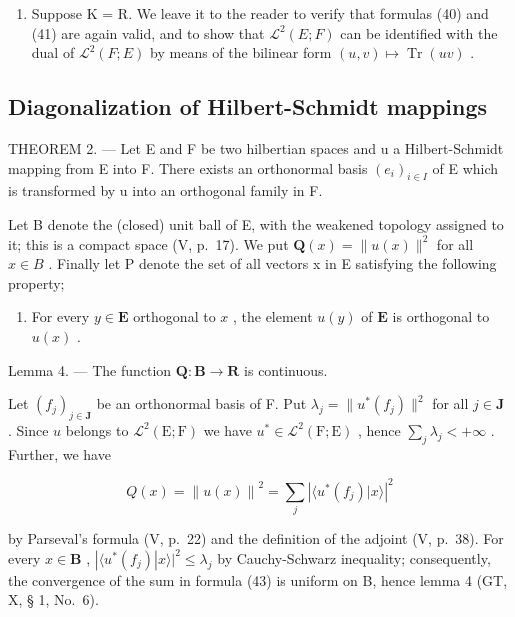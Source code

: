 \begin{enumerate}
\def\labelenumi{\arabic{enumi})}
\setcounter{enumi}{1}
\tightlist
\item
  Suppose K = R. We leave it to the reader to verify that formulas (40) and (41) are again valid, and to show that \(\mathcal{L}^{2}(E; F)\) can be identified with the dual of \(\mathcal{L}^{2}(F; E)\) by means of the bilinear form \((u, v) \mapsto \operatorname{Tr}(uv)\) .
\end{enumerate}

\subsection{Diagonalization of Hilbert-Schmidt mappings}

THEOREM 2. --- Let E and F be two hilbertian spaces and u a Hilbert-Schmidt mapping from E into F. There exists an orthonormal basis \((e_{i})_{i\in I}\) of E which is transformed by u into an orthogonal family in F.

Let B denote the (closed) unit ball of E, with the weakened topology assigned to it; this is a compact space (V, p.~17). We put \(\mathbf{Q}(x) = \|u(x)\|^{2}\) for all \(x \in B\) . Finally let P denote the set of all vectors x in E satisfying the following property;

\begin{enumerate}
\def\labelenumi{(\Alph{enumi})}
\setcounter{enumi}{7}
\tightlist
\item
  For every \(y \in \mathbf{E}\) orthogonal to \(x\) , the element \(u(y)\) of \(\mathbf{E}\) is orthogonal to \(u(x)\) .
\end{enumerate}

Lemma 4. --- The function \(\mathbf{Q}:\mathbf{B}\to \mathbf{R}\) is continuous.

Let \((f_j)_{j\in \mathbf{J}}\) be an orthonormal basis of F. Put \(\lambda_{j} = \| u^{*}(f_{j})\|^{2}\) for all \(j\in \mathbf{J}\) . Since \(u\) belongs to \(\mathcal{L}^2 (\mathrm{E};\mathrm{F})\) we have \(u^{*}\in \mathcal{L}^{2}(\mathrm{F};\mathrm{E})\) , hence \(\sum_{j}\lambda_{j} < + \infty\) . Further, we have

\[
Q (x) = \left\| u (x) \right\| ^ {2} = \sum_ {j} \left| \langle u ^ {*} (f _ {j}) | x \rangle \right| ^ {2}\tag{43}
\]

by Parseval's formula (V, p.~22) and the definition of the adjoint (V, p.~38). For every \(x \in \mathbf{B}\) , \(|\langle u^{*}(f_{j})|x\rangle|^{2} \leqslant \lambda_{j}\) by Cauchy-Schwarz inequality; consequently, the convergence of the sum in formula (43) is uniform on B, hence lemma 4 (GT, X, § 1, No.~6).

